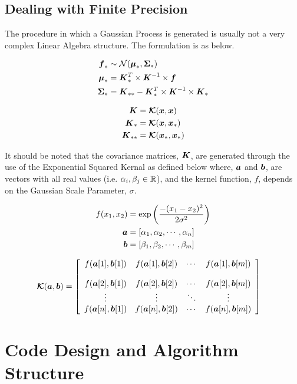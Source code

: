 \documentclass{article}
\begin{document}
\subsection{Dealing with Finite Precision}
The procedure in which a Gaussian Process is generated is usually not a very complex Linear Algebra structure. The formulation is as below. 

\begin{minipage}{.45\textwidth}
\begin{align*}
    \boldsymbol{f}_* &\sim \mathcal{N}(\boldsymbol{\mu}_*, \boldsymbol{\Sigma}_*) \\
    \boldsymbol{\mu}_* &= \boldsymbol{K}_*^T \times \boldsymbol{K}^{-1} \times \boldsymbol{f} \\
    \boldsymbol{\Sigma}_* &= \boldsymbol{K}_{**} - \boldsymbol{K}_*^T \times \boldsymbol{K}^{-1} \times \boldsymbol{K}_*
\end{align*}
\end{minipage}
\begin{minipage} {.45\textwidth}
\begin{align*}
    \boldsymbol{K} &= \boldsymbol{\mathcal{K}}(\boldsymbol{x}, \boldsymbol{x}) \\
    \boldsymbol{K}_* &= \boldsymbol{\mathcal{K}}(\boldsymbol{x}, \boldsymbol{x}_*) \\
    \boldsymbol{K}_{**} &= \boldsymbol{\mathcal{K}}(\boldsymbol{x}_*, \boldsymbol{x}_*)
\end{align*}
\end{minipage}


It should be noted that the covariance matrices, $\boldsymbol{K}$, are generated through the use of the Exponential Squared Kernal as defined below where, $\boldsymbol{a}$ and $\boldsymbol{b}$, are vectors with all real values (i.e. $\alpha_i, \beta_j \in \mathbb{R}$), and the kernel function, $f$, depends on the Gaussian Scale Parameter, $\sigma$. 

\begin{minipage}{.35\textwidth}
\begin{align*}
    f(x_1, x_2) &= \exp\left(\frac{-(x_1 - x_2)^2}{2\sigma^2}\right)\\
    \boldsymbol{a} &= [\alpha_1, \alpha_2, \cdots, \alpha_n]\\
    \boldsymbol{b} &= [\beta_1, \beta_2, \cdots, \beta_m] 
\end{align*}
\end{minipage}
\begin{minipage}{.6\textwidth}
\begin{align*}
    \boldsymbol{\mathcal{K}}(\boldsymbol{a}, \boldsymbol{b})  &= \left[
    \begin{array}{c c c c}
        f(\boldsymbol{a}[1], \boldsymbol{b}[1]) &f(\boldsymbol{a}[1], \boldsymbol{b}[2]) &\cdots &f(\boldsymbol{a}[1], \boldsymbol{b}[m]) \\
        \\
        f(\boldsymbol{a}[2], \boldsymbol{b}[1]) &f(\boldsymbol{a}[2], \boldsymbol{b}[2]) &\cdots &f(\boldsymbol{a}[2], \boldsymbol{b}[m]) \\
        \vdots &\vdots &\ddots &\vdots \\
        f(\boldsymbol{a}[n], \boldsymbol{b}[1]) &f(\boldsymbol{a}[n], \boldsymbol{b}[2]) &\cdots &f(\boldsymbol{a}[n], \boldsymbol{b}[m])
    \end{array}\right]
\end{align*}
\end{minipage}



\section{Code Design and Algorithm Structure}
\end{document}
